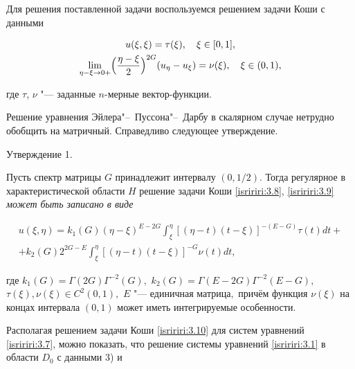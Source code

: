 Для решения поставленной задачи воспользуемся решением задачи Коши с данными

\begin{gather}

\label{isririri:3.8}

u(\xi,\xi)=\tau(\xi), \quad \xi\in [0, 1],

\\

\label{isririri:3.9} 

\lim\limits_{\eta-\xi\rightarrow0+}\Bigl(\frac{\eta-\xi}{2}\Bigr)^{2G}(u_\eta-u_\xi)=\nu(\xi), \quad \xi\in (0, 1),

\end{gather}

где $\tau$, $\nu$ "--- заданные $n$-мерные вектор-функции.



Решение уравнения Эйлера"--~Пуссона"--~Дарбу в скалярном случае \cite{rayanova:bib:Andreev1981} нетрудно обобщить на матричный. Справедливо следующее утверждение.



\smallskip



{\small \sc Утверждение 1.} {\it

Пусть спектр матрицы $G$ принадлежит интервалу $(0, 1/2)$. Тогда регулярное в характеристической области $H$ решение задачи Коши \rm \eqref{isririri:3.8}, \eqref{isririri:3.9} \it может быть записано в виде

\begin{multline}\label{isririri:3.10}

u(\xi,\eta)=k_1(G)(\eta-\xi)^{E-2G}\int _{\xi}^{\eta}[(\eta-t)(t-\xi)]^{-(E-G)}\tau(t)dt+\\

+k_2(G)2^{2G-E}\int _{\xi}^{\eta}[(\eta-t)(t-\xi)]^{-G}\nu(t)dt,

\end{multline}

где $k_1(G)=\Gamma(2G)\Gamma^{-2}(G),$ $k_2(G)=\Gamma(E-2G)\Gamma^{-2}(E-G),$ $\tau(\xi),\nu(\xi)\in {C}^{2}(0, 1),$ $E$ "--- единичная матрица$,$ причём функция $\nu(\xi)$ на концах интервала $(0, 1)$  может  иметь интегрируемые особенности\rm.

}



\smallskip



Располагая решением задачи Коши \eqref{isririri:3.10} для систем уравнений \eqref{isririri:3.7}, можно показать, что решение системы уравнений \eqref{isririri:3.1} в области $D_0$ с данными 3) и

